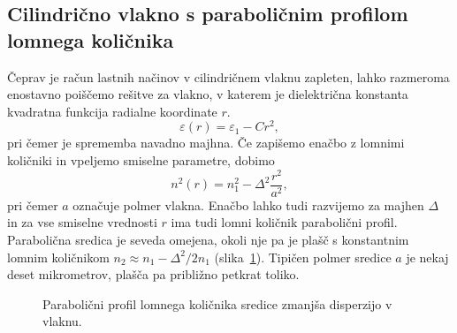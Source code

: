 \subsection*{Cilindrično vlakno s paraboličnim profilom lomnega količnika}
Čeprav je račun lastnih načinov v cilindričnem vlaknu zapleten, lahko 
razmeroma enostavno poiščemo rešitve za vlakno, v katerem je dielektrična 
konstanta kvadratna funkcija radialne koordinate $r$. 
\begin{equation}
\varepsilon (r) = \varepsilon_1 - C r^2,
\end{equation}
pri čemer je sprememba navadno majhna. Če zapišemo enačbo z lomnimi količniki
in vpeljemo smiselne parametre, dobimo
\begin{equation}
n^2\left(r\right)=n_{1}^{2}- \Delta^2 \frac{r^2}{a^2},
\label{9.15}
\end{equation}
pri čemer $a$ označuje polmer vlakna.
Enačbo lahko tudi razvijemo za majhen $\Delta$ in za vse smiselne vrednosti $r$
ima tudi lomni količnik parabolični profil. Parabolična
sredica je seveda omejena, okoli nje pa je plašč s konstantnim
lomnim količnikom $n_2 \approx n_1-\Delta^2/2n_1$ (slika~\ref{fig:GRIN}). 
Tipičen polmer sredice $a$ je nekaj deset mikrometrov, plašča pa približno petkrat toliko.
\begin{figure}[h]
\centering
\def\svgwidth{90truemm} 
 
\caption{Parabolični profil lomnega količnika sredice zmanjša disperzijo v vlaknu.}
\label{fig:GRIN}
\end{figure}

